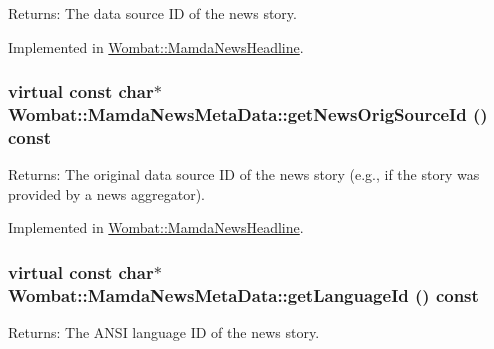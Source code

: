 \begin{Desc}
\item[Returns:]The data source ID of the news story. \end{Desc}


Implemented in \hyperlink{classWombat_1_1MamdaNewsHeadline_7566bd0297c11ef707348d9d3646363b}{Wombat::Mamda\-News\-Headline}.\hypertarget{classWombat_1_1MamdaNewsMetaData_5fe17063b6df522e76b7016884f964d1}{
\subsubsection[getNewsOrigSourceId]{\setlength{\rightskip}{0pt plus 5cm}virtual const char$\ast$ Wombat::Mamda\-News\-Meta\-Data::get\-News\-Orig\-Source\-Id () const}}
\label{classWombat_1_1MamdaNewsMetaData_5fe17063b6df522e76b7016884f964d1}


\begin{Desc}
\item[Returns:]The original data source ID of the news story (e.g., if the story was provided by a news aggregator). \end{Desc}


Implemented in \hyperlink{classWombat_1_1MamdaNewsHeadline_1e7a0a1b7ac2373b2d59c474f8962527}{Wombat::Mamda\-News\-Headline}.\hypertarget{classWombat_1_1MamdaNewsMetaData_213a4b9676abf7cf91a311a599edc2d3}{
\subsubsection[getLanguageId]{\setlength{\rightskip}{0pt plus 5cm}virtual const char$\ast$ Wombat::Mamda\-News\-Meta\-Data::get\-Language\-Id () const}}
\label{classWombat_1_1MamdaNewsMetaData_213a4b9676abf7cf91a311a599edc2d3}


\begin{Desc}
\item[Returns:]The ANSI language ID of the news story. \end{Desc}


